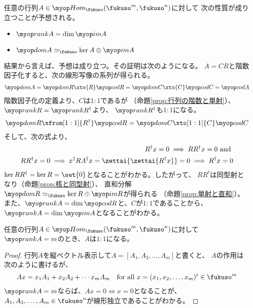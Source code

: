 	任意の行列$A\in\Hom_\fukuso(\fukuso^m,\fukuso^n)$に対して
	次の性質が成り立つことが予想される。
	\begin{itemize}\setlength{\itemsep}{-1mm} %
		\item $\rank A = \dim\im A$
		\item $\dom A\simeq_\fukuso \ker A\otimes \im A$
	\end{itemize} %
	結果から言えば、予想は成り立つ。その証明は次のようになる。
	$A=CR$と階数因子化すると、次の線形写像の系列が得られる。
	\begin{equation*}\begin{split} %
		\dom A = \dom R \xto{R} \codom R = \dom C \xto{C} \codom C = \codom A
	\end{split}\end{equation*} %
	階数因子化の定義より、$C$は$1:1$であるが
	（命題\ref{prop:行列の階数と単射}）、$\rank R=\rank R^\dag$より、
	$\rank R^\dag$も$1:1$になる。
	\begin{equation*}\begin{split} %
		\dom R \xfrom[1:1]{R^\dag} \codom R = \dom C \xto[1:1]{C} \codom C
	\end{split}\end{equation*} %
	そして、次の式より、
	\begin{equation*}\begin{split} %
		R^\dag x = 0 \implies RR^\dag x = 0 \text{ and } \\
		RR^\dag x = 0 \implies x^\dag RA^\dag x = \zettai{\zettai{R^\dag x}} = 0
		\implies R^\dag x = 0
	\end{split}\end{equation*} %
	$\ker RR^\dag=\ker R=\set{0}$となることがわかる。したがって、
	$RR^t$は同型射となり（命題\ref{prop:核と同型射}）、
	直和分解$\dom R\simeq_\fukuso \ker R\oplus \im R$が得られる
	（命題\ref{prop:単射と直和}）。
	また、$\rank A=\dim \codom R$と、$C$が$1:1$であることから、
	$\rank A=\dim\im A$となることがわかる。

	\begin{proposition}[行列の階数と単射]\label{prop:行列の階数と単射} %
		任意の行列$A\in\Hom_\fukuso(\fukuso^m,\fukuso^n)$に対して
		$\rank A=m$のとき、$A$は$1:1$になる。
	\end{proposition} %
	\begin{proof} %
		行列$A$を縦ベクトル表示して$A=[A_1,A_2,\dots,A_m]$と書くと、
		$A$の作用は次のように書けるが、
		\begin{equation*}\begin{split} %
			Ax = x_1A_1 + x_2A_2 + \cdots x_mA_m
			\quad\text{for all }x=(x_1,x_2,\dots,x_m)^t\in\fukuso^m
		\end{split}\end{equation*} %
		$\rank A=m$ならば、$Ax=0\iff x=0$となることが、
		$A_1,A_2,\dots,A_m\in\fukuso^n$が線形独立であることがわかる。
	\end{proof} %

